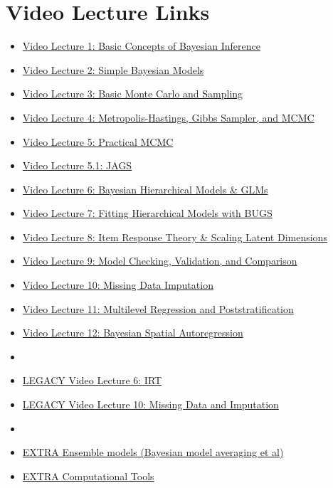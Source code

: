 \documentclass[11pt, leqno, fleqn]{article}
\begin{document}
\section*{Video Lecture Links}
\vspace{10pt}
\begin{itemize}
\item[] \href{http://youtu.be/BOWNHl3qOVA}{Video Lecture 1: Basic Concepts of Bayesian Inference} \\
\item[] \href{http://youtu.be/ps5MYi81IsE}{Video Lecture 2: Simple Bayesian Models} \\
\item[] \href{http://youtu.be/cxWzsCoYT8Q}{Video Lecture 3: Basic Monte Carlo and Sampling} \\
\item[] \href{http://youtu.be/j4nEAqUUnVw}{Video Lecture 4: Metropolis-Hastings, Gibbs Sampler, and MCMC} \\
\item[] \href{http://youtu.be/bGKgkK9vETQ}{Video Lecture 5: Practical MCMC} \\
\item[] \href{http://youtu.be/-89nkSHsFV4}{Video Lecture 5.1: JAGS}\\
\item[] \href{http://youtu.be/tbQkKu01kb8}{Video Lecture 6: Bayesian Hierarchical Models \& GLMs} \\
\item[] \href{}{Video Lecture 7: Fitting Hierarchical Models with BUGS} \\
\item[] \href{}{Video Lecture 8: Item Response Theory \& Scaling Latent Dimensions} \\
\item[] \href{}{Video Lecture 9: Model Checking, Validation, and Comparison} \\
\item[] \href{}{Video Lecture 10: Missing Data Imputation} \\
\item[] \href{}{Video Lecture 11: Multilevel Regression and Poststratification} \\
\item[] \href{}{Video Lecture 12: Bayesian Spatial Autoregression} \\
\item[]
\item[] \href{http://youtu.be/dfPq_WTFzQ0}{LEGACY Video Lecture 6: IRT} \\
\item[] \href{http://youtu.be/qfpZcsb32Z4}{LEGACY Video Lecture 10: Missing Data and Imputation} \\
\item[]
\item[] \href{https://www.youtube.com/watch?v=jAVHB3D04EY}{EXTRA Ensemble models (Bayesian model averaging et al)}\\
\item[] \href{https://www.youtube.com/watch?v=kcBcYev8oaU&index=6&list=PLAFC5F02F224FA59F}{EXTRA Computational Tools}\\
\end{itemize}
\end{document}
